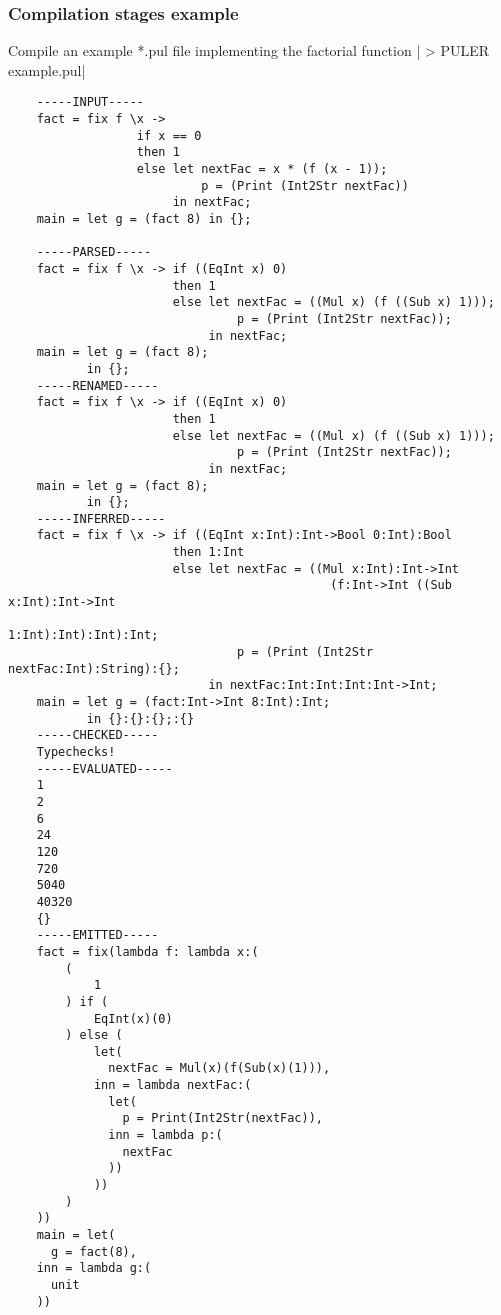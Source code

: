 \documentclass{article} %
\begin{document}
\subsubsection{Compilation stages example}\label{compiler_stages}
Compile an example *.pul file implementing the factorial function
|    > PULER example.pul|
\begin{verbatim}
    -----INPUT-----
    fact = fix f \x ->
                  if x == 0
                  then 1
                  else let nextFac = x * (f (x - 1));
                           p = (Print (Int2Str nextFac))
                       in nextFac;
    main = let g = (fact 8) in {};
    
    -----PARSED-----
    fact = fix f \x -> if ((EqInt x) 0)
                       then 1
                       else let nextFac = ((Mul x) (f ((Sub x) 1)));
                                p = (Print (Int2Str nextFac));
                            in nextFac;
    main = let g = (fact 8);
           in {};
    -----RENAMED-----
    fact = fix f \x -> if ((EqInt x) 0)
                       then 1
                       else let nextFac = ((Mul x) (f ((Sub x) 1)));
                                p = (Print (Int2Str nextFac));
                            in nextFac;
    main = let g = (fact 8);
           in {};
    -----INFERRED-----
    fact = fix f \x -> if ((EqInt x:Int):Int->Bool 0:Int):Bool
                       then 1:Int
                       else let nextFac = ((Mul x:Int):Int->Int
                                             (f:Int->Int ((Sub x:Int):Int->Int
                                                            1:Int):Int):Int):Int;
                                p = (Print (Int2Str nextFac:Int):String):{};
                            in nextFac:Int:Int:Int:Int->Int;
    main = let g = (fact:Int->Int 8:Int):Int;
           in {}:{}:{};:{}
    -----CHECKED-----
    Typechecks!
    -----EVALUATED-----
    1
    2
    6
    24
    120
    720
    5040
    40320
    {}
    -----EMITTED-----
    fact = fix(lambda f: lambda x:(
        (
            1
        ) if (
            EqInt(x)(0)
        ) else (
            let(
              nextFac = Mul(x)(f(Sub(x)(1))),
            inn = lambda nextFac:(
              let(
                p = Print(Int2Str(nextFac)),
              inn = lambda p:(
                nextFac
              ))
            ))
        )
    ))
    main = let(
      g = fact(8),
    inn = lambda g:(
      unit
    ))
\end{verbatim}
\end{document}
